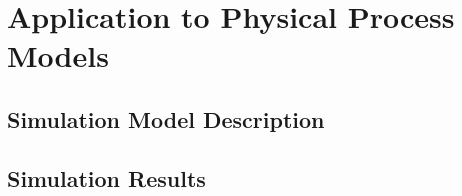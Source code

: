 \chapter{Application to Physical Process Models}
\label{c:physical}

\section{Simulation Model Description} \label{c:physical:s:sim}

\section{Simulation Results} \label{c:physical:s:results}
